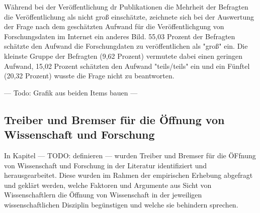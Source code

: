 Während bei der Veröffentlichung dr Publikationen die Mehrheit der Befragten die Veröffentlichung als nicht groß einschätzte, zeichnete sich bei der Auswertung der Frage nach dem geschätzten Aufwand für die Veröffentlichgung von Forschungsdaten im Internet ein anderes Bild. 55,03 Prozent der Befragten schätzte den Aufwand die Forschungdaten zu veröffentlichen als "groß" ein. Die kleinste Gruppe der Befragten (9,62 Prozent) vermutete dabei einen geringen Aufwand, 15,02 Prozent schätzten den Aufwand "teils/teils" ein und ein Fünftel (20,32 Prozent) wusste die Frage nicht zu beantworten.

--- Todo: Grafik aus beiden Items bauen ---

\subsection{Treiber und Bremser für die Öffnung von Wissenschaft und Forschung}

In Kapitel --- TODO: definieren --- wurden Treiber und Bremser für die ÖFfnung von Wissenschaft und Forschung in der Literatur identifiziert und herausgearbeitet. Diese wurden im Rahmen der empirischen Erhebung abgefragt und geklärt werden, welche Faktoren und Argumente aus Sicht von Wissenschaftlern die Öffnung von Wissenschaft in der jeweiligen wissenschaftlichen Disziplin begünstigen und welche sie behindern sprechen.

